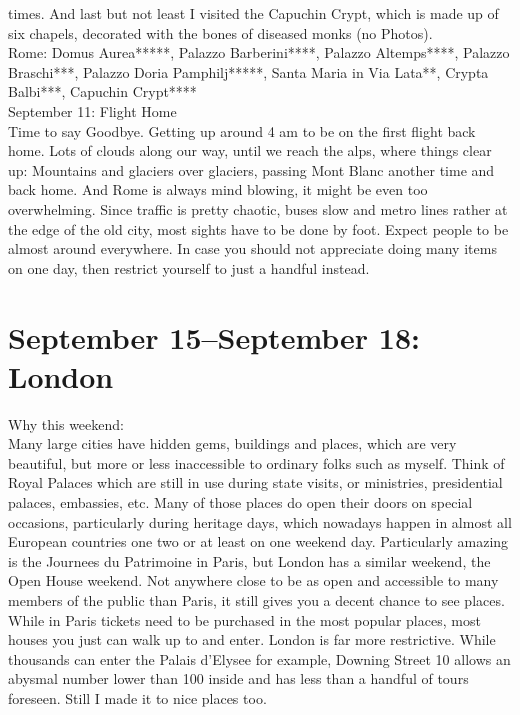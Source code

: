 times. And last but not least I visited the Capuchin Crypt, which is made up of six chapels, decorated with the bones of diseased monks (no Photos).\\

Rome: Domus Aurea*****, Palazzo Barberini****, Palazzo Altemps****, Palazzo Braschi***, Palazzo Doria Pamphilj*****, Santa Maria in Via Lata**, Crypta Balbi***, Capuchin Crypt****\\

September 11: Flight Home\\
Time to say Goodbye. Getting up around 4 am to be on the first flight back home. Lots of clouds along our way, until we reach the alps, where things clear up: Mountains and glaciers over glaciers, passing Mont Blanc another time and back home. And Rome is always mind blowing, it might be even too overwhelming. Since traffic is pretty chaotic, buses slow and metro lines rather at the edge of the old city, most sights have to be done by foot. Expect people to be almost around everywhere. In case you should not appreciate doing many items on one day, then restrict yourself to just a handful instead.


\section{September 15--September 18: London}
\label{London2017}

Why this weekend:\\
Many large cities have hidden gems, buildings and places, which are very beautiful, but more or less inaccessible to ordinary folks such as myself. Think of Royal Palaces which are still in use during state visits, or ministries, presidential palaces, embassies, etc. Many of those places do open their doors on special occasions, particularly during heritage days, which nowadays happen in almost all European countries one two or at least on one weekend day. Particularly amazing is the Journees du Patrimoine in Paris, but London has a similar weekend, the Open House weekend. Not anywhere close to be as open and accessible to many members of the public than Paris, it still gives you a decent chance to see places. While in Paris tickets need to be purchased in the most popular places, most houses you just can walk up to and enter. London is far more restrictive. While thousands can enter the Palais d'Elysee for example, Downing Street 10 allows an abysmal number lower than 100 inside and has less than a handful of tours foreseen. Still I made it to nice places too.\\

